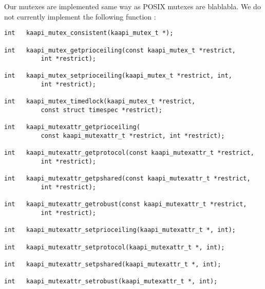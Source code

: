 Our mutexes are implemented same way as POSIX mutexes are blablabla. We do not
currently implement the following  function :

\begin{verbatim}
int   kaapi_mutex_consistent(kaapi_mutex_t *);

int   kaapi_mutex_getprioceiling(const kaapi_mutex_t *restrict,
          int *restrict);

int   kaapi_mutex_setprioceiling(kaapi_mutex_t *restrict, int,
          int *restrict);

int   kaapi_mutex_timedlock(kaapi_mutex_t *restrict,
          const struct timespec *restrict);

int   kaapi_mutexattr_getprioceiling(
          const kaapi_mutexattr_t *restrict, int *restrict);

int   kaapi_mutexattr_getprotocol(const kaapi_mutexattr_t *restrict,
          int *restrict);

int   kaapi_mutexattr_getpshared(const kaapi_mutexattr_t *restrict,
          int *restrict);

int   kaapi_mutexattr_getrobust(const kaapi_mutexattr_t *restrict,
          int *restrict);

int   kaapi_mutexattr_setprioceiling(kaapi_mutexattr_t *, int);

int   kaapi_mutexattr_setprotocol(kaapi_mutexattr_t *, int);

int   kaapi_mutexattr_setpshared(kaapi_mutexattr_t *, int);

int   kaapi_mutexattr_setrobust(kaapi_mutexattr_t *, int);
\end{verbatim}

